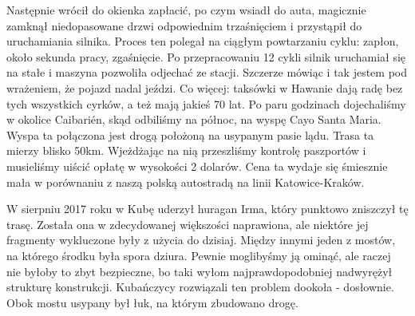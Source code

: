 Następnie wrócił do okienka zapłacić, po czym wsiadł do auta, magicznie zamknął niedopasowane drzwi odpowiednim trzaśnięciem i przystąpił do uruchamiania silnika.
Proces ten polegał na ciągłym powtarzaniu cyklu: zapłon, około sekunda pracy, zgaśnięcie.
Po przepracowaniu 12 cykli silnik uruchamiał się na stałe i maszyna pozwoliła odjechać ze stacji.
Szczerze mówiąc i tak jestem pod wrażeniem, że pojazd nadal jeździ.
Co więcej: taksówki w Hawanie dają radę bez tych wszystkich cyrków, a też mają jakieś 70 lat.
Po paru godzinach dojechaliśmy w okolice Caibarién, skąd odbiliśmy na północ, na wyspę Cayo Santa Maria.
Wyspa ta połączona jest drogą położoną na usypanym pasie lądu.
Trasa ta mierzy blisko 50km.
Wjeżdżając na nią przeszliśmy kontrolę paszportów i musieliśmy uiścić opłatę w wysokości 2 dolarów.
Cena ta wydaje się śmiesznie mała w porównaniu z naszą polską autostradą na linii Katowice-Kraków.
\par W sierpniu 2017 roku w Kubę uderzył huragan Irma, który punktowo zniszczył tę trasę.
Została ona w zdecydowanej większości naprawiona, ale niektóre jej fragmenty wykluczone były z użycia do dzisiaj.
Między innymi jeden z mostów, na którego środku była spora dziura. Pewnie moglibyśmy ją ominąć, ale raczej nie byłoby to zbyt bezpieczne, bo taki wyłom najprawdopodobniej nadwyrężył strukturę konstrukcji.
Kubańczycy rozwiązali ten problem dookoła - dosłownie.
Obok mostu usypany był łuk, na którym zbudowano drogę.

